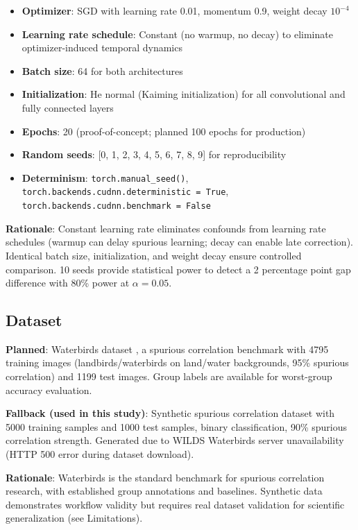 \begin{itemize}
\item \textbf{Optimizer}: SGD with learning rate 0.01, momentum 0.9, weight decay $10^{-4}$
\item \textbf{Learning rate schedule}: Constant (no warmup, no decay) to eliminate optimizer-induced temporal dynamics
\item \textbf{Batch size}: 64 for both architectures
\item \textbf{Initialization}: He normal (Kaiming initialization) for all convolutional and fully connected layers
\item \textbf{Epochs}: 20 (proof-of-concept; planned 100 epochs for production)
\item \textbf{Random seeds}: [0, 1, 2, 3, 4, 5, 6, 7, 8, 9] for reproducibility
\item \textbf{Determinism}: \texttt{torch.manual\_seed()}, \texttt{torch.backends.cudnn.deterministic = True}, \texttt{torch.backends.cudnn.benchmark = False}
\end{itemize}

\textbf{Rationale}: Constant learning rate eliminates confounds from learning rate schedules (warmup can delay spurious learning; decay can enable late correction). Identical batch size, initialization, and weight decay ensure controlled comparison. 10 seeds provide statistical power to detect a 2 percentage point gap difference with 80\% power at $\alpha = 0.05$.

\subsection{Dataset}

\textbf{Planned}: Waterbirds dataset \cite{sagawa2020distributionally}, a spurious correlation benchmark with 4795 training images (landbirds/waterbirds on land/water backgrounds, 95\% spurious correlation) and 1199 test images. Group labels are available for worst-group accuracy evaluation.

\textbf{Fallback (used in this study)}: Synthetic spurious correlation dataset with 5000 training samples and 1000 test samples, binary classification, 90\% spurious correlation strength. Generated due to WILDS Waterbirds server unavailability (HTTP 500 error during dataset download).

\textbf{Rationale}: Waterbirds is the standard benchmark for spurious correlation research, with established group annotations and baselines. Synthetic data demonstrates workflow validity but requires real dataset validation for scientific generalization (see Limitations).

